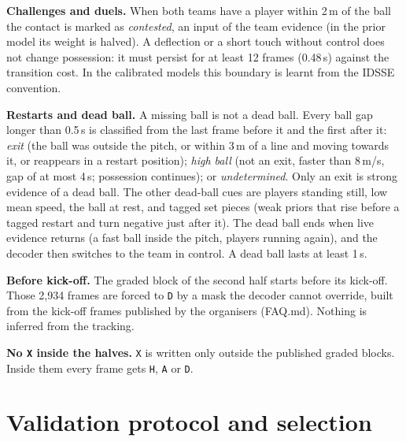 \documentclass[journal]{IEEEtran}
\begin{document}
\textbf{Challenges and duels.} When both teams have a player within 2\,m of the ball the contact is marked as \emph{contested}, an input of the team evidence (in the prior model its weight is halved). A deflection or a short touch without control does not change possession: it must persist for at least 12 frames (0.48\,s) against the transition cost. In the calibrated models this boundary is learnt from the IDSSE convention.

\textbf{Restarts and dead ball.} A missing ball is not a dead ball. Every ball gap longer than 0.5\,s is classified from the last frame before it and the first after it: \emph{exit} (the ball was outside the pitch, or within 3\,m of a line and moving towards it, or reappears in a restart position); \emph{high ball} (not an exit, faster than 8\,m/s, gap of at most 4\,s; possession continues); or \emph{undetermined}. Only an exit is strong evidence of a dead ball. The other dead-ball cues are players standing still, low mean speed, the ball at rest, and tagged set pieces (weak priors that rise before a tagged restart and turn negative just after it). The dead ball ends when live evidence returns (a fast ball inside the pitch, players running again), and the decoder then switches to the team in control. A dead ball lasts at least 1\,s.

\textbf{Before kick-off.} The graded block of the second half starts before its kick-off. Those 2{,}934 frames are forced to \texttt{D} by a mask the decoder cannot override, built from the kick-off frames published by the organisers (FAQ.md). Nothing is inferred from the tracking.

\textbf{No \texttt{X} inside the halves.} \texttt{X} is written only outside the published graded blocks. Inside them every frame gets \texttt{H}, \texttt{A} or \texttt{D}.

\section{Validation protocol and selection}
\label{sec:validation}
\end{document}
